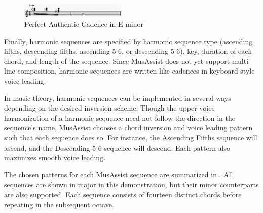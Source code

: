\documentclass{article}
\begin{document}
\begin{figure}[h!]
\centering
\includegraphics[width=0.45\textwidth]{images/perfauth}
  \caption{Perfect Authentic Cadence in E\musFlat\; minor \label{fig:perfauth}}
\end{figure}

Finally, harmonic sequences are specified by harmonic sequence type (ascending fifths, descending fifths, ascending 5-6, or descending 5-6), key, duration of each chord, and length of the sequence. Since MusAssist does not yet support multi-line composition, harmonic sequences are written like cadences in keyboard-style voice leading.

In music theory, harmonic sequences can be implemented in several ways depending on the desired inversion scheme. Though the upper-voice harmonization of a harmonic sequence need not follow the direction in the sequence’s name, MusAssist chooses a chord inversion and voice leading pattern such that each sequence does so. For instance, the Ascending Fifths sequence will ascend, and the Descending 5-6 sequence will descend. Each pattern also maximizes smooth voice leading. 

The chosen patterns for each MusAssist sequence are summarized in  .
All sequences are shown in major in this demonstration, but their minor counterparts are also supported. Each sequence consists of fourteen distinct chords before repeating in the subsequent octave. 
\end{document}
